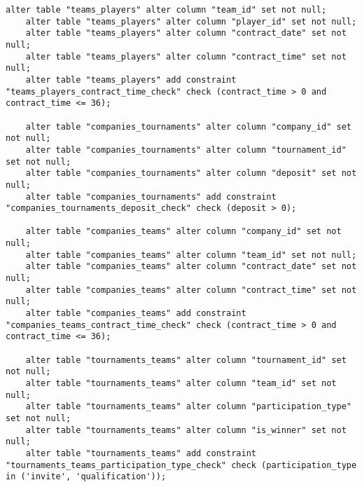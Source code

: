\begin{appendices}
\begin{lstlisting}[caption={Сценарий создания ограничений в базе данных (часть 3)}]
	alter table "teams_players" alter column "team_id" set not null;
	alter table "teams_players" alter column "player_id" set not null;
	alter table "teams_players" alter column "contract_date" set not null;
	alter table "teams_players" alter column "contract_time" set not null;
	alter table "teams_players" add constraint "teams_players_contract_time_check" check (contract_time > 0 and contract_time <= 36);
	
	alter table "companies_tournaments" alter column "company_id" set not null;
	alter table "companies_tournaments" alter column "tournament_id" set not null;
	alter table "companies_tournaments" alter column "deposit" set not null;
	alter table "companies_tournaments" add constraint "companies_tournaments_deposit_check" check (deposit > 0);
	
	alter table "companies_teams" alter column "company_id" set not null;
	alter table "companies_teams" alter column "team_id" set not null;
	alter table "companies_teams" alter column "contract_date" set not null;
	alter table "companies_teams" alter column "contract_time" set not null;
	alter table "companies_teams" add constraint "companies_teams_contract_time_check" check (contract_time > 0 and contract_time <= 36);
	
	alter table "tournaments_teams" alter column "tournament_id" set not null;
	alter table "tournaments_teams" alter column "team_id" set not null;
	alter table "tournaments_teams" alter column "participation_type" set not null;
	alter table "tournaments_teams" alter column "is_winner" set not null;
	alter table "tournaments_teams" add constraint "tournaments_teams_participation_type_check" check (participation_type in ('invite', 'qualification'));
	
\end{lstlisting}

\clearpage


\end{appendices}
